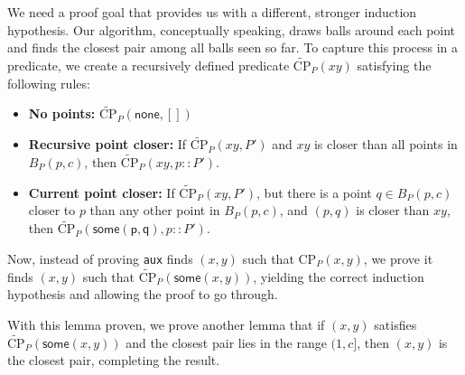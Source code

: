 \documentclass{article}
\begin{document}
We need a proof goal that provides us with a different, stronger induction hypothesis.
Our algorithm, conceptually speaking, draws balls around each point and finds the closest pair among all balls seen so far.
To capture this process in a predicate, we create a recursively defined predicate $\widetilde{\text{CP}}_P(x\!y)$ satisfying the following rules:
\begin{itemize}
  \item \textbf{No points:} $\widetilde{\text{CP}}_P(\mathsf{none}, [])$
  \label{case:rec_pt_closer}
  \item \textbf{Recursive point closer:} If $\widetilde{\text{CP}}_P(x\!y, P')$ and $x\!y$ is closer than all points in $B_P(p, c)$, then $\widetilde{\text{CP}}_P(x\!y, p :: P')$.
  \label{case:curr_pt_closer}
  \item \textbf{Current point closer:} If $\widetilde{\text{CP}}_P(x\!y, P')$, but there is a point $q \in B_P(p, c)$ closer to $p$ than any other point in $B_P(p, c)$, and $(p, q)$ is closer than $x\!y$, then $\widetilde{\text{CP}}_P(\mathsf{some(p, q)}, p :: P')$.
\end{itemize}
Now, instead of proving \texttt{aux} finds $(x, y)$ such that $\text{CP}_P(x, y)$, we prove it finds $(x, y)$ such that $\widetilde{\text{CP}}_P(\mathsf{some}(x, y))$, yielding the correct induction hypothesis and allowing the proof to go through.

With this lemma proven, we prove another lemma that if $(x, y)$ satisfies $\widetilde{\text{CP}}_P(\mathsf{some}(x, y))$ and the closest pair lies in the range $(1, c]$, then $(x, y)$ is the closest pair, completing the result.



\end{document}
